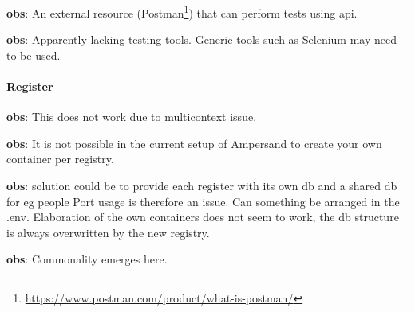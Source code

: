 \begin{obs}\label{obs:rq1-69:14-11}
    \textbf{obs}: An external resource (Postman\footnote{\url{https://www.postman.com/product/what-is-postman/}}) that can perform tests using api.
\end{obs}

\begin{obs}\label{obs:rq1-36:3-10}
    \textbf{obs}: Apparently lacking testing tools.
    Generic tools such as Selenium may need to be used.
\end{obs}

\paragraph{Register}
\begin{obs}\label{obs:rq1-85:30-11}
    \textbf{obs}: This does not work due to multicontext issue.
\end{obs}

\begin{obs}\label{obs:rq1-92:14-12}
    \textbf{obs}: It is not possible in the current setup of Ampersand to create your own container per registry.
\end{obs}
    
\begin{obs}\label{obs:rq1-93:19-12}
    \textbf{obs}: solution could be to provide each register with its own db and a shared db for eg people
    Port usage is therefore an issue.
    Can something be arranged in the .env.
    Elaboration of the own containers does not seem to work, the db structure is always overwritten by the new registry.
\end{obs}

\begin{obs}\label{obs:rq3-9:19-9}
    \textbf{obs}: Commonality emerges here.
\end{obs}

